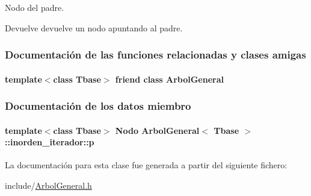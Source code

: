 Nodo del padre. 

\begin{DoxyReturn}{Devuelve}
devuelve un nodo apuntando al padre. 
\end{DoxyReturn}


\subsubsection{Documentación de las funciones relacionadas y clases amigas}
\hypertarget{classArbolGeneral_1_1inorden__iterador_a9c06e31b7c3e0d4ee5b03003d32935a5}{
\paragraph[{Arbol\-General}]{\setlength{\rightskip}{0pt plus 5cm}template$<$class Tbase$>$ friend class {\bf Arbol\-General}\hspace{0.3cm}{\ttfamily [friend]}}}\label{classArbolGeneral_1_1inorden__iterador_a9c06e31b7c3e0d4ee5b03003d32935a5}


\subsubsection{Documentación de los datos miembro}
\hypertarget{classArbolGeneral_1_1inorden__iterador_a77d9424a41cf406909fe131c11ccc856}{
\paragraph[{p}]{\setlength{\rightskip}{0pt plus 5cm}template$<$class Tbase$>$ {\bf Nodo} {\bf Arbol\-General}$<$ Tbase $>$\-::inorden\-\_\-iterador\-::p\hspace{0.3cm}{\ttfamily [private]}}}\label{classArbolGeneral_1_1inorden__iterador_a77d9424a41cf406909fe131c11ccc856}


La documentación para esta clase fue generada a partir del siguiente fichero\-:\begin{DoxyCompactItemize}
\item 
include/\hyperlink{ArbolGeneral_8h}{Arbol\-General.\-h}\end{DoxyCompactItemize}

